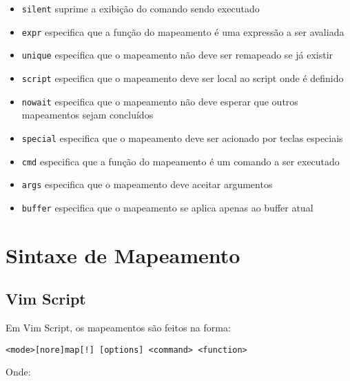 \begin{itemize}
    \setlength{\itemsep}{-5pt} %
    \item \texttt{silent} suprime a exibição do comando sendo executado
    \item \texttt{expr} especifica que a função do mapeamento é uma expressão a ser avaliada
    \item \texttt{unique} especifica que o mapeamento não deve ser remapeado se já existir
    \item \texttt{script} especifica que o mapeamento deve ser local ao script onde é definido
    \item \texttt{nowait} especifica que o mapeamento não deve esperar que outros mapeamentos sejam concluídos
    \item \texttt{special} especifica que o mapeamento deve ser acionado por teclas especiais
    \item \texttt{cmd} especifica que a função do mapeamento é um comando a ser executado
    \item \texttt{args} especifica que o mapeamento deve aceitar argumentos
    \item \texttt{buffer} especifica que o mapeamento se aplica apenas ao buffer atual
\end{itemize}

\section{Sintaxe de Mapeamento}

\subsection{Vim Script}

Em Vim Script, os mapeamentos são feitos na forma:

\begin{lstlisting}
<mode>[nore]map[!] [options] <command> <function>
\end{lstlisting}

Onde:

